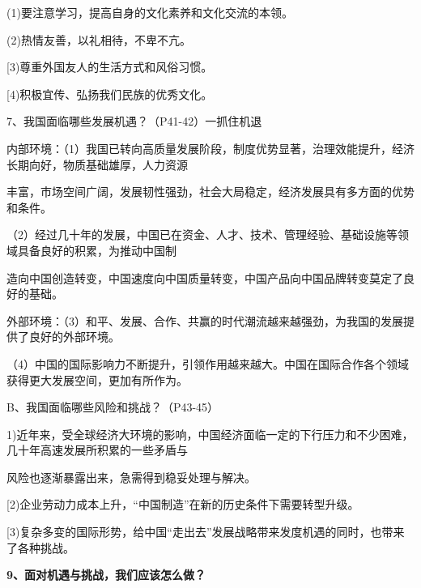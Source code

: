 \documentclass[lang=cn,11pt]{elegantbook}
\begin{document}
(1)要注意学习，提高自身的文化素养和文化交流的本领。\par

(2)热情友善，以礼相待，不卑不亢。\par

[3)尊重外国友人的生活方式和风俗习惯。\par

[4)积极宜传、弘扬我们民族的优秀文化。\par

7、我国面临哪些发展机遇？（P41-42）一抓住机退\par

内部环境：（1）我国已转向高质量发展阶段，制度优势显著，治理效能提升，经济长期向好，物质基础雄厚，人力资源\par

丰富，市场空间广阔，发展韧性强劲，社会大局稳定，经济发展具有多方面的优势和条件。\par

（2）经过几十年的发展，中国已在资金、人才、技术、管理经验、基础设施等领域具备良好的积累，为推动中国制\par

造向中国创造转变，中国速度向中国质量转变，中国产品向中国品牌转变莫定了良好的基础。\par

外部环境：（3）和平、发展、合作、共赢的时代潮流越来越强劲，为我国的发展提供了良好的外部环境。\par

（4）中国的国际影响力不断提升，引领作用越来越大。中国在国际合作各个领域获得更大发展空间，更加有所作为。\par

B、我国面临哪些风险和挑战？（P43-45）\par

1)近年来，受全球经济大环境的影响，中国经济面临一定的下行压力和不少困难，几十年高速发展所积累的一些矛盾与\par

风险也逐渐暴露出来，急需得到稳妥处理与解决。\par

[2)企业劳动力成本上升，“中国制造”在新的历史条件下需要转型升级。\par

[3)复杂多变的国际形势，给中国“走出去”发展战略带来发度机遇的同时，也带来了各种挑战。\par

\textbf{9、面对机遇与挑战，我们应该怎么做？}\par
\end{document}
